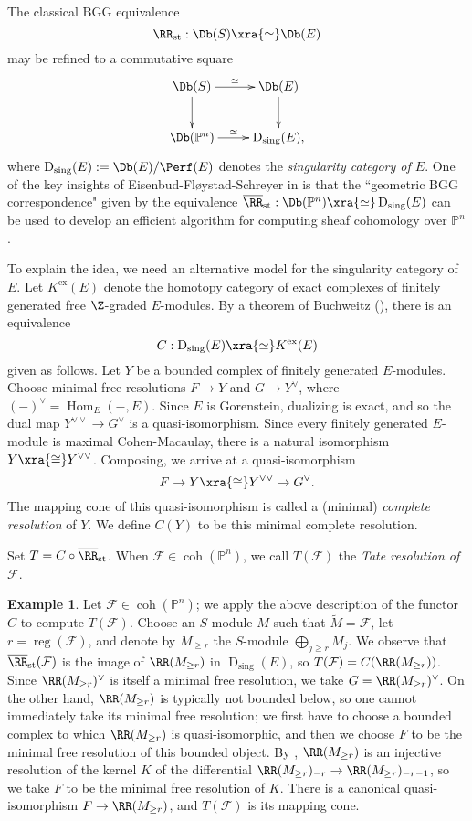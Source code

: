 \documentclass[12pt]{amsart}
\theoremstyle{definition}
\newtheorem{example}[lemma]{Example}
\theoremstyle{remark}
\newcommand{\PP}{\mathbb P}
\newcommand{\Hom}{\operatorname{Hom}} %
\newcommand{\F}{\FF}
\def\on{\operatorname}
\def\F{\mathcal{F}}
\begin{document}
The classical BGG equivalence 
$$
\RR_{\on{st}} : \Db(S) \xra{\simeq} \Db(E)
$$
may be refined to a commutative square
$$
\xymatrix{
\Db(S) \ar[r]^-{\simeq} \ar[d]& \Db(E) \ar[d] \\
\Db(\PP^n) \ar[r]^-{\simeq}& \on{D}_{\on{sing}}(E), \\
}
$$
where $\on{D}_{\on{sing}}(E) := \Db(E) / \Perf(E)$ denotes the \emph{singularity category of $E$}. One of the key insights of Eisenbud-Fl\o ystad-Schreyer in \cite{EFS} is that the ``geometric BGG correspondence" given by the equivalence $\overline{\RR}_{\on{st}}:\Db(\PP^n) \xra{\simeq} \on{D}_{\on{sing}}(E)$ can be used to develop an efficient algorithm for computing sheaf cohomology over $\PP^n$.

To explain the idea, we need an alternative model for the singularity category of $E$. Let $K^{\on{ex}}(E)$ denote the homotopy category of exact complexes of finitely generated free  $\Z$-graded $E$-modules. By a theorem of Buchweitz (\cite[Theorem 4.4.1]{buchweitz}), there is an equivalence 
$$
C: \on{D}_{\on{sing}}(E) \xra{\simeq} K^{\on{ex}}(E)
$$
given as follows. Let $Y$ be a bounded complex of finitely generated $E$-modules. Choose minimal free resolutions $F \to Y$ and $G \to Y^\vee$, where $( - )^{\vee} = \Hom_E( - , E)$. Since $E$ is Gorenstein, dualizing is exact, and so the dual map $Y^{\vee \vee} \to G^\vee$ is a quasi-isomorphism. Since every finitely generated $E$-module is maximal Cohen-Macaulay, there is a natural isomorphism $Y \xra{\cong} Y^{\vee \vee}$. Composing, we arrive at a quasi-isomorphism
$$
F \to Y \xra{\cong} Y^{\vee \vee} \to G^{\vee}. 
$$
The mapping cone of this quasi-isomorphism is called a (minimal) \emph{complete resolution} of $Y$. We define $C(Y)$ to be this minimal complete resolution.

Set $T = C \circ \overline{\RR}_{\on{st}}$. When $\F \in \on{coh}(\PP^n)$, we call $T(\F)$ the \emph{Tate resolution of $\F$}. 

\begin{example}
\label{tateex}
Let $\F \in \on{coh}(\PP^n)$; we apply the above description of the functor $C$ to compute $T(\F)$. Choose an $S$-module $M$ such that $\widetilde{M} = \F$, let $r = \on{reg}(\F)$, and denote by $M_{\ge r}$ the $S$-module $\bigoplus_{j \ge r} M_j$. We observe that $\overline{\RR}_{\on{st}}(\F)$ is the image of $\RR(M_{\ge r})$ in $\on{D}_{\on{sing}}(E)$, so $T(\F) = C(\RR(M_{\ge r}))$. Since $\RR(M_{\ge r})^\vee$ is itself a minimal free resolution, we take $G = \RR(M_{\ge r})^\vee$. On the other hand, $\RR(M_{\ge r})$ is typically not bounded below, so one cannot immediately take its minimal free resolution; we first have to choose a bounded complex to which $\RR(M_{\ge r})$ is quasi-isomorphic, and then we choose $F$ to be the minimal free resolution of this bounded object. By \cite[Corollary 2.4]{EFS}, $\RR(M_{\ge r})$ is an injective resolution of the kernel $K$ of the differential $\RR(M_{\ge r})_{-r} \to \RR(M_{\ge r})_{-r -1}$, so we take $F$ to be the minimal free resolution of $K$. There is a canonical quasi-isomorphism $F \to \RR(M_{\ge r})$, and $T(\F)$ is its mapping cone.
\end{example}
\end{document}
